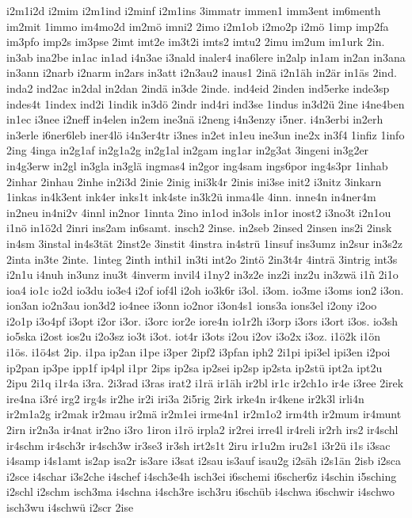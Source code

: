 {i2m1i2d
i2mim
i2m1ind
i2minf
i2m1ins
3immatr
immen1
imm3ent
im6menth
im2mit
1immo
im4mo2d
im2mö
imni2
2imo
i2m1ob
i2mo2p
i2mö
1imp
imp2fa
im3pfo
imp2s
im3pse
2imt
imt2e
im3t2i
imts2
imtu2
2imu
im2um
im1urk
2in.
in3ab
ina2be
in1ac
in1ad
i4n3ae
i3nald
inaler4
ina6lere
in2alp
in1am
in2an
in3ana
in3ann
i2narb
i2narm
in2ars
in3att
i2n3au2
inaus1
2inä
i2n1äh
in2är
in1äs
2ind.
inda2
ind2ac
in2dal
in2dan
2indä
in3de
2inde.
ind4eid
2inden
ind5erke
inde3sp
indes4t
1index
ind2i
1indik
in3dö
2indr
ind4ri
ind3se
1indus
in3d2ü
2ine
i4ne4ben
in1ec
i3nee
i2neff
in4elen
in2em
ine3nä
i2neng
i4n3enzy
i5ner.
i4n3erbi
in2erh
in3erle
i6ner6leb
iner4lö
i4n3er4tr
i3nes
in2et
in1eu
ine3un
ine2x
in3f4
1infiz
1info
2ing
4inga
in2g1af
in2g1a2g
in2g1al
in2gam
ing1ar
in2g3at
3ingeni
in3g2er
in4g3erw
in2gl
in3gla
in3glä
ingmas4
in2gor
ing4sam
ings6por
ing4s3pr
1inhab
2inhar
2inhau
2inhe
in2i3d
2inie
2inig
ini3k4r
2inis
ini3se
init2
i3nitz
3inkarn
1inkas
in4k3ent
ink4er
inks1t
ink4ste
in3k2ü
inma4le
4inn.
inne4n
in4ner4m
in2neu
in4ni2v
4innl
in2nor
1innta
2ino
in1od
in3ols
in1or
inost2
i3no3t
i2n1ou
i1nö
in1ö2d
2inri
ins2am
in6samt.
insch2
2inse.
in2seb
2insed
2insen
ins2i
2insk
in4sm
3instal
in4s3tät
2inst2e
3instit
4instra
in4strü
1insuf
ins3umz
in2sur
in3s2z
2inta
in3te
2inte.
1integ
2inth
inthi1
in3ti
int2o
2intö
2in3t4r
4inträ
3intrig
int3s
i2n1u
i4nuh
in3unz
inu3t
4inverm
invil4
i1ny2
in3z2e
inz2i
inz2u
in3zwä
i1ñ
2i1o
ioa4
io1c
io2d
io3du
io3e4
i2of
iof4l
i2oh
io3k6r
i3ol.
i3om.
io3me
i3oms
ion2
i3on.
ion3an
io2n3au
ion3d2
io4nee
i3onn
io2nor
i3on4s1
ions3a
ions3el
i2ony
i2oo
i2o1p
i3o4pf
i3opt
i2or
i3or.
i3orc
ior2e
iore4n
io1r2h
i3orp
i3ors
i3ort
i3os.
io3sh
io5ska
i2ost
ios2u
i2o3sz
io3t
i3ot.
iot4r
i3ots
i2ou
i2ov
i3o2x
i3oz.
i1ö2k
i1ön
i1ös.
i1ö4st
2ip.
i1pa
ip2an
i1pe
i3per
2ipf2
i3pfan
iph2
2i1pi
ipi3el
ipi3en
i2poi
ip2pan
ip3pe
ipp1f
ip4pl
i1pr
2ips
ip2sa
ip2sei
ip2sp
ip2sta
ip2stü
ipt2a
ipt2u
2ipu
2i1q
i1r4a
i3ra.
2i3rad
i3ras
irat2
i1rä
ir1äh
ir2bl
ir1c
ir2ch1o
ir4e
i3ree
2irek
ire4na
i3ré
irg2
irg4s
ir2he
ir2i
iri3a
2i5rig
2irk
irke4n
ir4kene
ir2k3l
irli4n
ir2m1a2g
ir2mak
ir2mau
ir2mä
ir2m1ei
irme4n1
ir2m1o2
irm4th
ir2mum
ir4munt
2irn
ir2n3a
ir4nat
ir2no
i3ro
1iron
i1rö
irpla2
ir2rei
irre4l
ir4reli
ir2rh
irs2
ir4schl
ir4schm
ir4sch3r
ir4sch3w
ir3se3
ir3sh
irt2s1t
2iru
ir1u2m
iru2s1
i3r2ü
i1s
i3sac
i4samp
i4s1amt
is2ap
isa2r
is3are
i3sat
i2sau
is3auf
isau2g
i2säh
i2s1än
2isb
i2sca
i2sce
i4schar
i3s2che
i4schef
i4sch3e4h
isch3ei
i6schemi
i6scher6z
i4schin
i5sching
i2schl
i2schm
isch3ma
i4schna
i4sch3re
isch3ru
i6schüb
i4schwa
i6schwir
i4schwo
isch3wu
i4schwü
i2scr
2ise
}
